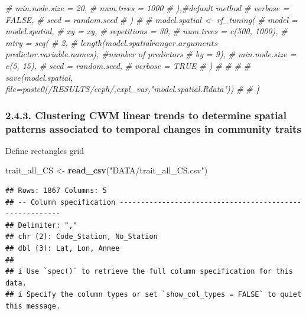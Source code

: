 \documentclass[
]{article}
\newenvironment{Shaded}{\begin{snugshade}}{\end{snugshade}}
\newcommand{\CommentTok}[1]{\textcolor[rgb]{0.56,0.35,0.01}{\textit{#1}}}
\newcommand{\FunctionTok}[1]{\textcolor[rgb]{0.13,0.29,0.53}{\textbf{#1}}}
\newcommand{\NormalTok}[1]{#1}
\newcommand{\OtherTok}[1]{\textcolor[rgb]{0.56,0.35,0.01}{#1}}
\newcommand{\StringTok}[1]{\textcolor[rgb]{0.31,0.60,0.02}{#1}}
\begin{document}
\begin{Shaded}
\begin{Highlighting}[]
\CommentTok{\#         min.node.size = 20,}
\CommentTok{\#         num.trees = 1000}
\CommentTok{\#       ),\#default method}
\CommentTok{\#       verbose = FALSE,}
\CommentTok{\#       seed = random.seed}
\CommentTok{\#     )}
\CommentTok{\# }
\CommentTok{\# model.spatial \textless{}{-} rf\_tuning(}
\CommentTok{\#   model = model.spatial,}
\CommentTok{\#   xy = xy,}
\CommentTok{\#   repetitions = 30,}
\CommentTok{\#   num.trees = c(500, 1000),}
\CommentTok{\#   mtry = seq(}
\CommentTok{\#     2,}
\CommentTok{\#     length(model.spatial$ranger.arguments$predictor.variable.names), \#number of predictors}
\CommentTok{\#     by = 9),}
\CommentTok{\#   min.node.size = c(5, 15),}
\CommentTok{\#   seed = random.seed,}
\CommentTok{\#   verbose = TRUE}
\CommentTok{\# )}
\CommentTok{\# }
\CommentTok{\# }
\CommentTok{\# \# save(model.spatial, file=paste0(\textquotesingle{}/RESULTS/ceph/\textquotesingle{},expl\_var,"model.spatial.Rdata"))}
\CommentTok{\# }
\CommentTok{\# \}}
\end{Highlighting}
\end{Shaded}

\subsubsection{2.4.3. Clustering CWM linear trends to determine spatial
patterns associated to temporal changes in community
traits}\label{clustering-cwm-linear-trends-to-determine-spatial-patterns-associated-to-temporal-changes-in-community-traits}

Define rectangles grid

\begin{Shaded}
\begin{Highlighting}[]
\NormalTok{trait\_all\_CS }\OtherTok{\textless{}{-}} \FunctionTok{read\_csv}\NormalTok{(}\StringTok{"DATA/trait\_all\_CS.csv"}\NormalTok{)}
\end{Highlighting}
\end{Shaded}

\begin{verbatim}
## Rows: 1867 Columns: 5
## -- Column specification --------------------------------------------------------
## Delimiter: ","
## chr (2): Code_Station, No_Station
## dbl (3): Lat, Lon, Annee
## 
## i Use `spec()` to retrieve the full column specification for this data.
## i Specify the column types or set `show_col_types = FALSE` to quiet this message.
\end{verbatim}
\end{document}
